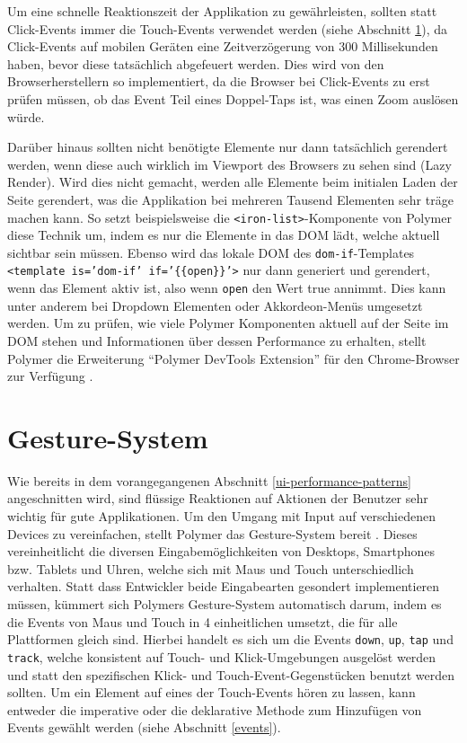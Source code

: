 Um eine schnelle Reaktionszeit der Applikation zu gewährleisten, sollten statt Click-Events immer die Touch-Events verwendet werden (siehe Abschnitt \ref{gesture-system}), da Click-Events auf mobilen Geräten eine Zeitverzögerung von 300 Millisekunden haben, bevor diese tat\-s\"ach\-lich abgefeuert werden. Dies wird von den Browserherstellern so implementiert, da die Browser bei Click-Events zu erst prüfen müssen, ob das Event Teil eines Doppel-Taps ist, was einen Zoom auslösen würde.

Darüber hinaus sollten nicht benötigte Elemente nur dann tatsächlich gerendert werden, wenn diese auch wirklich im Viewport des Browsers zu sehen sind (Lazy Render). Wird dies nicht gemacht, werden alle Elemente beim initialen Laden der Seite gerendert, was die Applikation bei mehreren Tausend Elementen sehr träge machen kann. So setzt beispielsweise die \texttt{\textless{}iron-list\textgreater{}}-Komponente von Polymer diese Technik um, indem es nur die Elemente in das \ac{DOM} lädt, welche aktuell sichtbar sein müssen. Ebenso wird das lokale \ac{DOM} des \texttt{dom-if}-Templates \texttt{\textless{}template\ is='dom-if'\ if='\{\{open\}\}'\textgreater{}} nur dann generiert und gerendert, wenn das Element aktiv ist, also wenn \texttt{open} den Wert true annimmt. Dies kann unter anderem bei Dropdown Elementen oder Akkordeon-Menüs umgesetzt werden. Um zu prüfen, wie viele Polymer Komponenten aktuell auf der Seite im \ac{DOM} stehen und Informationen über dessen Performance zu erhalten, stellt Polymer die Erweiterung ``Polymer DevTools Extension'' für den Chrome-Browser zur Verfügung \cite{citeulike:13915202}.


\section{Gesture-System}\label{gesture-system}

Wie bereits in dem vorangegangenen Abschnitt \ref{ui-performance-patterns} angeschnitten wird, sind flüssige Reaktionen auf Aktionen der Benutzer sehr wichtig für gute Applikationen. Um den Umgang mit Input auf verschiedenen Devices zu vereinfachen, stellt Polymer das Gesture-System bereit \cite{citeulike:13915222}. Dieses vereinheitlicht die diversen Eingabemöglichkeiten von Desktops, Smartphones bzw. Tablets und Uhren, welche sich mit Maus und Touch unterschiedlich verhalten. Statt dass Entwickler beide Eingabearten gesondert implementieren müssen, kümmert sich Polymers Gesture-System automatisch darum, indem es die Events von Maus und Touch in 4 einheitlichen umsetzt, die für alle Plattformen gleich sind. Hierbei handelt es sich um die Events \texttt{down}, \texttt{up}, \texttt{tap} und \texttt{track}, welche konsistent auf Touch- und Klick-Umgebungen ausgelöst werden und statt den spezifischen Klick- und Touch-Event-Gegenstücken benutzt werden sollten. Um ein Element auf eines der Touch-Events hören zu lassen, kann entweder die imperative oder die deklarative Methode zum Hinzufügen von Events gewählt werden (siehe Abschnitt \ref{events}).


